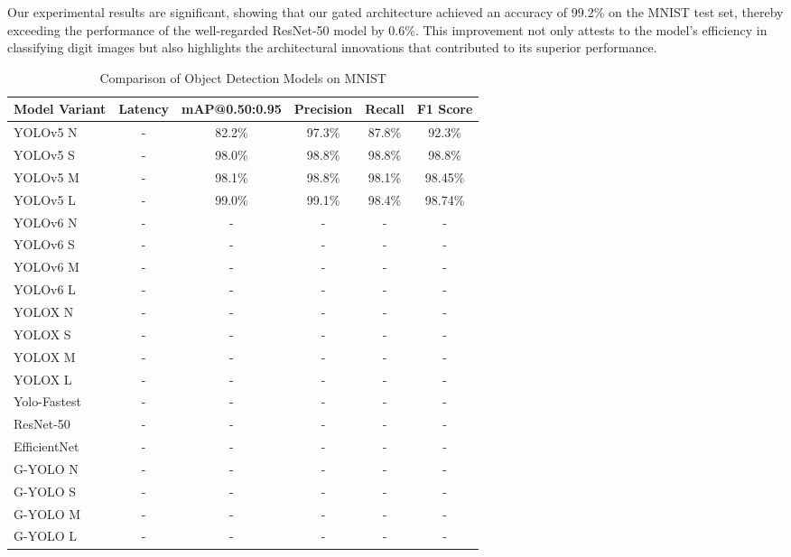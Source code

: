 Our experimental results are significant, showing that our gated architecture achieved an accuracy of 99.2\% on the MNIST test set, thereby exceeding the performance of the well-regarded ResNet-50 model by 0.6\%. This improvement not only attests to the model's efficiency in classifying digit images but also highlights the architectural innovations that contributed to its superior performance.

\begin{table}[htbp]
    \centering
    \caption{Comparison of Object Detection Models on MNIST}
    \label{tab:mnist_model_comparison}
    \begin{tabularx}{\textwidth}{@{}Xccccc@{}}
    \toprule
    Model Variant & Latency & mAP@0.50:0.95 & Precision & Recall & F1 Score \\ 
    \midrule
    \cite{ultralytics2021yolov5}YOLOv5 N & - & 82.2\% & 97.3\% & 87.8\% & 92.3\% \\
    \cite{ultralytics2021yolov5}YOLOv5 S & - & 98.0\% & 98.8\% & 98.8\% & 98.8\% \\
    \cite{ultralytics2021yolov5}YOLOv5 M & - & 98.1\% & 98.8\% & 98.1\% & 98.45\% \\
    \cite{ultralytics2021yolov5}YOLOv5 L & - & 99.0\% & 99.1\% & 98.4\% & 98.74\% \\
    \addlinespace
    \cite{li2023yolov6}YOLOv6 N & - & - & - & - & - \\
    \cite{li2023yolov6}YOLOv6 S & - & - & - & - & - \\
    \cite{li2023yolov6}YOLOv6 M & - & - & - & - & - \\
    \cite{li2023yolov6}YOLOv6 L & - & - & - & - & - \\
    \addlinespace
    \cite{ge2021yolox}YOLOX N & - & - & - & - & - \\
    \cite{ge2021yolox}YOLOX S & - & - & - & - & - \\
    \cite{ge2021yolox}YOLOX M & - & - & - & - & - \\
    \cite{ge2021yolox}YOLOX L & - & - & - & - & - \\
    \addlinespace
    \cite{dog2021dog}Yolo-Fastest & - & - & - & - & - \\
    \cite{he2016deep}ResNet-50 & - & - & - & - & - \\
    \cite{tan2019efficientnet}EfficientNet & - & - & - & - & - \\
    \addlinespace
    G-YOLO N & - & - & - & - & - \\
    G-YOLO S & - & - & - & - & - \\
    G-YOLO M & - & - & - & - & - \\
    G-YOLO L & - & - & - & - & - \\
    \bottomrule
    \end{tabularx}
\end{table}


